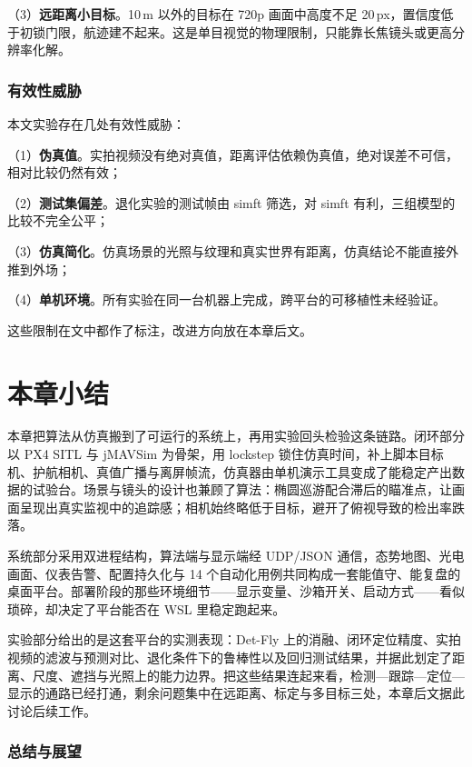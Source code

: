 （3）\textbf{远距离小目标}。10\,m 以外的目标在 720p 画面中高度不足 20\,px，置信度低于初锁门限，航迹建不起来。这是单目视觉的物理限制，只能靠长焦镜头或更高分辨率化解。

\subsubsection{有效性威胁}

本文实验存在几处有效性威胁：

（1）\textbf{伪真值}。实拍视频没有绝对真值，距离评估依赖伪真值，绝对误差不可信，相对比较仍然有效；

（2）\textbf{测试集偏差}。退化实验的测试帧由 simft 筛选，对 simft 有利，三组模型的比较不完全公平；

（3）\textbf{仿真简化}。仿真场景的光照与纹理和真实世界有距离，仿真结论不能直接外推到外场；

（4）\textbf{单机环境}。所有实验在同一台机器上完成，跨平台的可移植性未经验证。

这些限制在文中都作了标注，改进方向放在本章后文。

\section{本章小结}

本章把算法从仿真搬到了可运行的系统上，再用实验回头检验这条链路。闭环部分以 PX4 SITL 与 jMAVSim 为骨架，用 lockstep 锁住仿真时间，补上脚本目标机、护航相机、真值广播与离屏帧流，仿真器由单机演示工具变成了能稳定产出数据的试验台。场景与镜头的设计也兼顾了算法：椭圆巡游配合滞后的瞄准点，让画面呈现出真实监视中的追踪感；相机始终略低于目标，避开了俯视导致的检出率跌落。

系统部分采用双进程结构，算法端与显示端经 UDP/JSON 通信，态势地图、光电画面、仪表告警、配置持久化与 14 个自动化用例共同构成一套能值守、能复盘的桌面平台。部署阶段的那些环境细节——显示变量、沙箱开关、启动方式——看似琐碎，却决定了平台能否在 WSL 里稳定跑起来。

实验部分给出的是这套平台的实测表现：Det-Fly 上的消融、闭环定位精度、实拍视频的滤波与预测对比、退化条件下的鲁棒性以及回归测试结果，并据此划定了距离、尺度、遮挡与光照上的能力边界。把这些结果连起来看，检测—跟踪—定位—显示的通路已经打通，剩余问题集中在远距离、标定与多目标三处，本章后文据此讨论后续工作。


\subsubsection{总结与展望}

